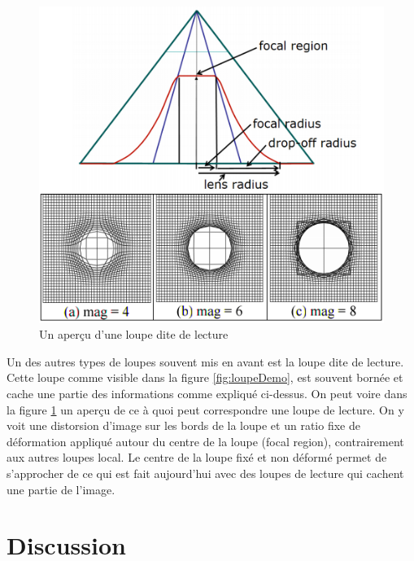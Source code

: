 \begin{figure}[!ht]
	\center	
	\includegraphics[scale=0.7]{image/LoupeLecture.png}
	\caption{Un aperçu d'une loupe dite de lecture}
	\label{fig:loupeLecture}
\end{figure}

Un des autres types de loupes souvent mis en avant est la loupe dite de lecture. Cette loupe comme visible dans la figure \ref{fig:loupeDemo}, est souvent bornée et cache une partie des informations comme expliqué ci-dessus. On peut voire dans la figure \ref{fig:loupeLecture} un aperçu de ce à quoi peut correspondre une loupe de lecture. On y voit une distorsion d'image sur les bords de la loupe et un ratio fixe de déformation appliqué autour du centre de la loupe (focal region), contrairement aux autres loupes local. Le centre de la loupe fixé et non déformé permet de s'approcher de ce qui est fait aujourd'hui avec des loupes de lecture qui cachent une partie de l'image.

\section{Discussion}











